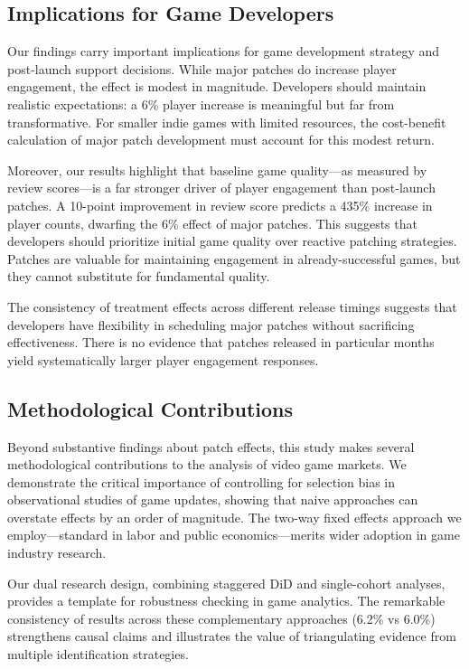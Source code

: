 \documentclass[12pt,a4paper]{article}
\begin{document}
\subsection{Implications for Game Developers}

Our findings carry important implications for game development strategy and post-launch support decisions. While major patches do increase player engagement, the effect is modest in magnitude. Developers should maintain realistic expectations: a 6\% player increase is meaningful but far from transformative. For smaller indie games with limited resources, the cost-benefit calculation of major patch development must account for this modest return.

Moreover, our results highlight that baseline game quality---as measured by review scores---is a far stronger driver of player engagement than post-launch patches. A 10-point improvement in review score predicts a 435\% increase in player counts, dwarfing the 6\% effect of major patches. This suggests that developers should prioritize initial game quality over reactive patching strategies. Patches are valuable for maintaining engagement in already-successful games, but they cannot substitute for fundamental quality.

The consistency of treatment effects across different release timings suggests that developers have flexibility in scheduling major patches without sacrificing effectiveness. There is no evidence that patches released in particular months yield systematically larger player engagement responses.

\subsection{Methodological Contributions}

Beyond substantive findings about patch effects, this study makes several methodological contributions to the analysis of video game markets. We demonstrate the critical importance of controlling for selection bias in observational studies of game updates, showing that naive approaches can overstate effects by an order of magnitude. The two-way fixed effects approach we employ---standard in labor and public economics---merits wider adoption in game industry research.

Our dual research design, combining staggered DiD and single-cohort analyses, provides a template for robustness checking in game analytics. The remarkable consistency of results across these complementary approaches (6.2\% vs 6.0\%) strengthens causal claims and illustrates the value of triangulating evidence from multiple identification strategies.
\end{document}
